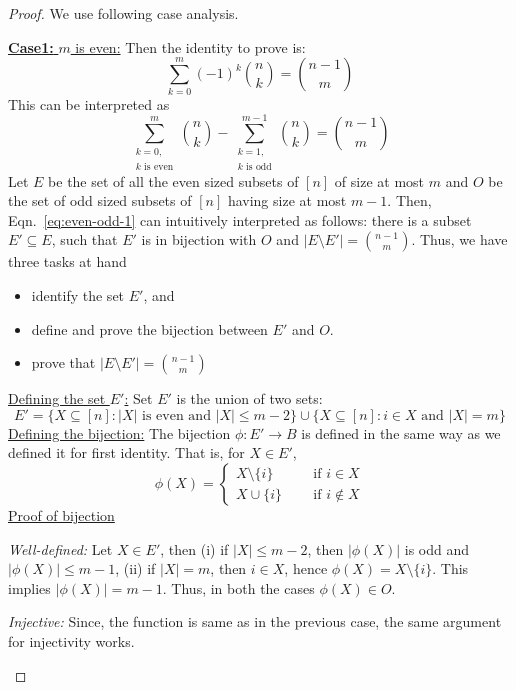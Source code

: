 \begin{proof}
We use following case analysis. 
\begin{description}
\item \underline{\textbf{Case1:} $m$ is even:} Then the identity to prove is:
\begin{equation} \label{eq:even-odd}
    \sum_{k=0}^m (-1)^k{n\choose k} = {n-1\choose m}
\end{equation}
This can be interpreted as 
\begin{equation} \label{eq:even-odd-1}
    \sum_{\substack{k=0,\\k\text{ is even}}}^m {n\choose k} -  \sum_{\substack{k=1,\\k\text{ is odd}}}^{m-1} {n\choose k} = {n-1\choose m}
\end{equation}
Let $E$ be the set of all the even sized subsets of $[n]$ of size at most $m$ and $O$ be the set of odd sized subsets of $[n]$ having size at most $m-1$. Then, Eqn.~\eqref{eq:even-odd-1} can intuitively interpreted as follows: there is a subset $E'\subseteq E$, such that $E'$ is in bijection with $O$ and $|E\setminus E'| = {n-1\choose m}$. Thus, we have three tasks at hand
\begin{itemize}
    \item identify the set $E'$, and
    \item define and prove the bijection between $E'$ and $O$.
    \item prove that $|E\setminus E'| = {n-1\choose m}$
\end{itemize}
\underline{Defining the set $E'$:} Set $E'$ is the union of two sets: 
$$E' = \{X\subseteq [n]: |X| \textrm{ is even and } |X|\le m-2\}\cup\{X\subseteq [n]: i\in X \textrm{ and } |X| = m\}$$
\underline{Defining the bijection:} The bijection $\phi:E'\rightarrow B$ is defined in the same way as we defined it for first identity. That is, for $X\in E'$,
\[
\phi(X) = 
\begin{cases}
X\setminus \{i\} & ~~~~~\text{ if } i\in X\\
X\cup\{i\} & ~~~~~\text{ if } i\not\in X
\end{cases}
\]
\underline{Proof of bijection}
\begin{description}
\item \textit{Well-defined:} Let $X\in E'$, then (i) if $|X|\le m-2$, then $|\phi(X)|$ is odd and $|\phi(X)|\le m-1$, (ii) if $|X| = m$, then $i\in X$, hence $\phi(X) = X\setminus \{i\}$. This implies $|\phi(X)| = m-1$. Thus, in both the cases $\phi(X)\in O$.
\item \textit{Injective:} Since, the function is same as in the previous case, the same argument for injectivity works.

\end{description}
\end{description}
\end{proof}
